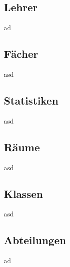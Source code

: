 \subsection{Lehrer}
ad
\subsection{Fächer}
asd
\subsection{Statistiken}
asd
\subsection{Räume}
asd
\subsection{Klassen}
asd
\subsection{Abteilungen}
ad